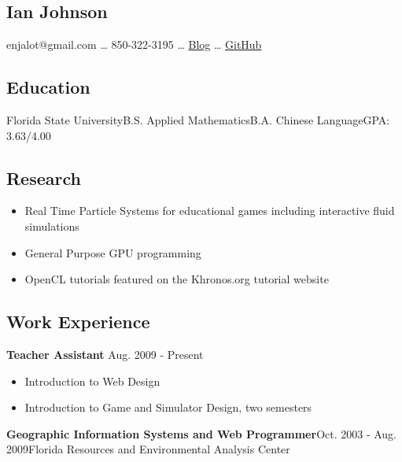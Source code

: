 \documentclass{article}
\begin{document}
 
\hypertarget{ian_johnson}{}\subsection*{{Ian Johnson}}\label{ian_johnson}

enjalot@gmail.com \ldots{} 850-322-3195 \ldots{} \href{http://enja.org}{Blog} \ldots{} \href{http://github.com/enjalot}{GitHub}

\hypertarget{education}{}\subsection*{{Education}}\label{education}

Florida State University\newline B.S. Applied Mathematics\newline B.A. Chinese Language\newline GPA: 3.63/4.00

\hypertarget{research}{}\subsection*{{Research}}\label{research}

\begin{itemize}%
\item Real Time Particle Systems for educational games including interactive fluid simulations
\item General Purpose GPU programming
\item OpenCL tutorials featured on the Khronos.org tutorial website

\end{itemize}
\hypertarget{work_experience}{}\subsection*{{Work Experience}}\label{work_experience}

\textbf{Teacher Assistant} Aug. 2009 - Present

\begin{itemize}%
\item Introduction to Web Design
\item Introduction to Game and Simulator Design, two semesters

\end{itemize}
\textbf{Geographic Information Systems and Web Programmer}\newline Oct. 2003 - Aug. 2009\newline Florida Resources and Environmental Analysis Center
\end{document}
